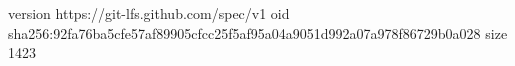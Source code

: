version https://git-lfs.github.com/spec/v1
oid sha256:92fa76ba5cfe57af89905cfcc25f5af95a04a9051d992a07a978f86729b0a028
size 1423
